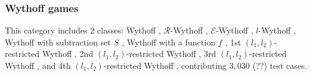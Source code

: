 \documentclass[review]{elsarticle}
\begin{document}
\subsubsection{Wythoff games}
This category includes $2$ classes: Wythoff \cite{Wyt1907}, $\mathcal{R}$-Wythoff \cite{Ho2012}, $\mathcal{E}$-Wythoff \cite{Ho2012}, $l$-Wythoff \cite{Fra1982}, Wythoff with subtraction set $S$ \cite{DucFGN2009}, Wythoff with a function $f$ \cite{LiuZ2015}, 1st $(l_1, l_2)$-restricted Wythoff \cite{FraH2014}, 2nd $(l_1, l_2)$-restricted Wythoff \cite{Gur2012}, 3rd $(l_1, l_2)$-restricted Wythoff \cite{LiuL2014}, and 4th $(l_1, l_2)$-restricted Wythoff \cite{EriS2009}, contributing $3,030$ (??) test cases. %

\end{document}
